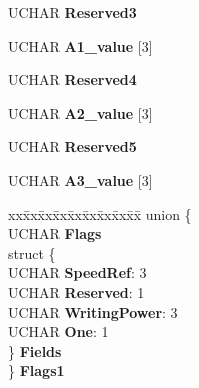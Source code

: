 \begin{DoxyCompactItemize}
\begin{tabbing}
\end{tabbing}\item 
\mbox{\label{struct___r_e_a_d___t_o_c___a_t_i_p_af7f8c96c29fd16b1ba9ef462dc47522b}} 
U\+C\+H\+AR {\bfseries Reserved3}
\item 
\mbox{\label{struct___r_e_a_d___t_o_c___a_t_i_p_ad78cd9360309df5b664549390b0d2f53}} 
U\+C\+H\+AR {\bfseries A1\+\_\+value} \mbox{[}3\mbox{]}
\item 
\mbox{\label{struct___r_e_a_d___t_o_c___a_t_i_p_a735e76e1b92de76a256ffa74d18da72d}} 
U\+C\+H\+AR {\bfseries Reserved4}
\item 
\mbox{\label{struct___r_e_a_d___t_o_c___a_t_i_p_aff7d58fe410f3dfdedd89542f6115687}} 
U\+C\+H\+AR {\bfseries A2\+\_\+value} \mbox{[}3\mbox{]}
\item 
\mbox{\label{struct___r_e_a_d___t_o_c___a_t_i_p_aa14a549496aadc1afede3d98fa095b54}} 
U\+C\+H\+AR {\bfseries Reserved5}
\item 
\mbox{\label{struct___r_e_a_d___t_o_c___a_t_i_p_a5ade835f0075fdd55ab139741fe44fb4}} 
U\+C\+H\+AR {\bfseries A3\+\_\+value} \mbox{[}3\mbox{]}
\item 
\mbox{\label{struct___r_e_a_d___t_o_c___a_t_i_p_ae258f454c1a41e7c780488962075391d}} 
\begin{tabbing}
xx\=xx\=xx\=xx\=xx\=xx\=xx\=xx\=xx\=\kill
union \{\\
\>UCHAR {\bfseries Flags}\\
\>struct \{\\
\>\>UCHAR {\bfseries SpeedRef}: 3\\
\>\>UCHAR {\bfseries Reserved}: 1\\
\>\>UCHAR {\bfseries WritingPower}: 3\\
\>\>UCHAR {\bfseries One}: 1\\
\>\} {\bfseries Fields}\\
\} {\bfseries Flags1}\\


\end{tabbing}
\end{DoxyCompactItemize}
